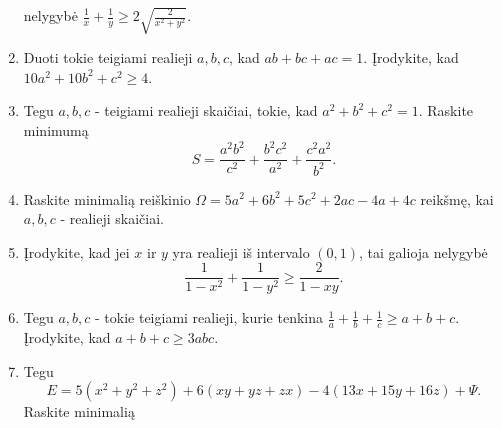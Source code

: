 \begin{enumerate}
    nelygybė $\frac{1}{x}+\frac{1}{y}\geq 2\sqrt{\frac{2}{x^2+y^2}}$.
  \item Duoti tokie teigiami realieji $a,b,c$, kad $ab+bc+ac=1$. Įrodykite,
    kad $10a^2+10b^2+c^2\geq4$.
  \item Tegu $a,b,c$ - teigiami realieji skaičiai, tokie, kad
    $a^2+b^2+c^2=1.$ Raskite minimumą
    $$S=\frac{a^2b^2}{c^2}+\frac{b^2c^2}{a^2}+\frac{c^2a^2}{b^2}.$$
  \item Raskite minimalią reiškinio $\Omega=5a^2+6b^2+5c^2+2ac-4a+4c$
    reikšmę, kai $a,b,c$ - realieji skaičiai.
  \item Įrodykite, kad jei $x$ ir $y$ yra realieji iš intervalo $(0,1)$,
    tai galioja nelygybė
    $$\frac{1}{1-x^2}+\frac{1}{1-y^2}\geq\frac{2}{1-xy}.$$
  \item Tegu $a,b,c$ - tokie teigiami realieji, kurie tenkina
    $\frac{1}{a}+\frac{1}{b}+\frac{1}{c}\geq a+b+c$. Įrodykite, kad
    $a+b+c\geq3abc$.
  \item {} Tegu
    $$E=5(x^2+y^2+z^2)+6(xy+yz+zx)-4(13x+15y+16z)+\Psi.$$ Raskite minimalią

\end{enumerate}
